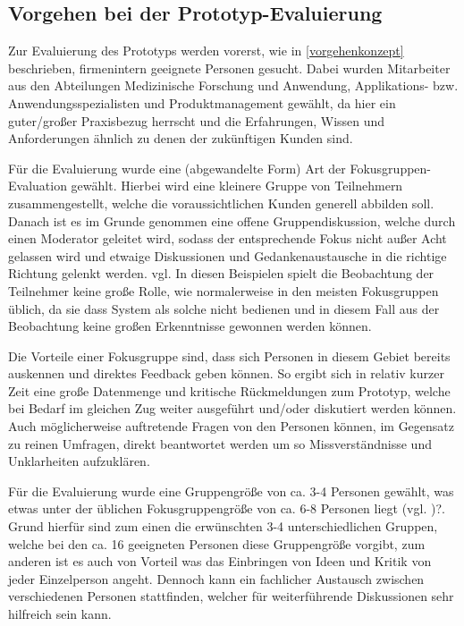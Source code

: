 \subsection{Vorgehen bei der Prototyp-Evaluierung}
Zur Evaluierung des Prototyps werden vorerst, wie in \ref{vorgehenkonzept} beschrieben, firmenintern geeignete Personen gesucht. 
Dabei wurden Mitarbeiter aus den Abteilungen Medizinische Forschung und Anwendung, Applikations- bzw. Anwendungsspezialisten und Produktmanagement gewählt, da hier ein guter/großer Praxisbezug herrscht und die Erfahrungen, Wissen und Anforderungen ähnlich zu denen der zukünftigen Kunden sind.

Für die Evaluierung wurde eine (abgewandelte Form) Art der Fokusgruppen-Evaluation gewählt. \cite{Christoforakos.2017} 
Hierbei wird eine kleinere Gruppe von Teilnehmern zusammengestellt, welche die voraussichtlichen Kunden generell abbilden soll. 
Danach ist es im Grunde genommen eine offene Gruppendiskussion, welche durch einen Moderator geleitet wird, sodass der entsprechende Fokus nicht außer Acht gelassen wird und etwaige Diskussionen und Gedankenaustausche in die richtige Richtung gelenkt werden. vgl. \cite{UsabilityinGermany.}
In diesen Beispielen spielt die Beobachtung der Teilnehmer keine große Rolle, wie normalerweise in den meisten Fokusgruppen üblich, da sie dass System als solche nicht bedienen und in diesem Fall aus der Beobachtung keine großen Erkenntnisse gewonnen werden können.

Die Vorteile einer Fokusgruppe sind, dass sich Personen in diesem Gebiet bereits auskennen und direktes Feedback geben können. 
So ergibt sich in relativ kurzer Zeit eine große Datenmenge und kritische Rückmeldungen zum Prototyp, welche bei Bedarf im gleichen Zug weiter ausgeführt und/oder diskutiert werden können.
Auch möglicherweise auftretende Fragen von den Personen können, im Gegensatz zu reinen Umfragen, direkt beantwortet werden um so Missverständnisse und Unklarheiten aufzuklären.

Für die Evaluierung wurde eine Gruppengröße von ca. 3-4 Personen gewählt, was etwas unter der üblichen Fokusgruppengröße von ca. 6-8 Personen liegt (vgl. \cite{UsabilityinGermany.})?. 
Grund hierfür sind zum einen die erwünschten 3-4 unterschiedlichen Gruppen, welche bei den ca. 16 geeigneten Personen diese Gruppengröße vorgibt, zum anderen ist es auch von Vorteil was das Einbringen von Ideen und Kritik von jeder Einzelperson angeht.
Dennoch kann ein fachlicher Austausch zwischen verschiedenen Personen stattfinden, welcher für weiterführende Diskussionen sehr hilfreich sein kann. 

